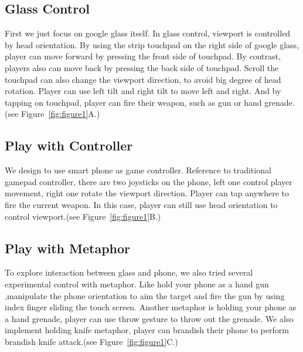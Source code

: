 \documentclass{sigchi}
\begin{document}
\subsection{Glass Control}
First we just focus on google glass itself. In glass control, viewport is controlled by head orientation. By using the strip touchpad on the right side of google glass, player can move forward by pressing the front side of touchpad. By contrast, players also can move back by pressing the back side of touchpad. Scroll the touchpad can also change the viewport direction, to avoid big degree of head rotation. Player can use left tilt and right tilt to move left and right. And by tapping on touchpad, player can fire their weapon, such as gun or hand grenade. (see Figure~\ref{fig:figure1}A.)

\subsection{Play with Controller}
We design to use smart phone as game controller. Reference to traditional gamepad controller, there are two joysticks on the phone, left one control player movement, right one rotate the viewport direction. Player can tap anywhere to fire the current weapon. In this case, player can still use head orientation to control viewport.(see Figure~\ref{fig:figure1}B.)

\subsection{Play with Metaphor}
To explore interaction between glass and phone, we also tried several experimental control with metaphor. Like hold your phone as a hand gun ,manipulate the phone orientation to aim the target and fire the gun by using index finger sliding the touch screen. Another metaphor is holding your phone as a hand grenade, player can use throw gesture to throw out the grenade. We also implement holding knife metaphor, player can brandish their phone to perform brandish knife attack.(see Figure~\ref{fig:figure1}C.)

\end{document}

